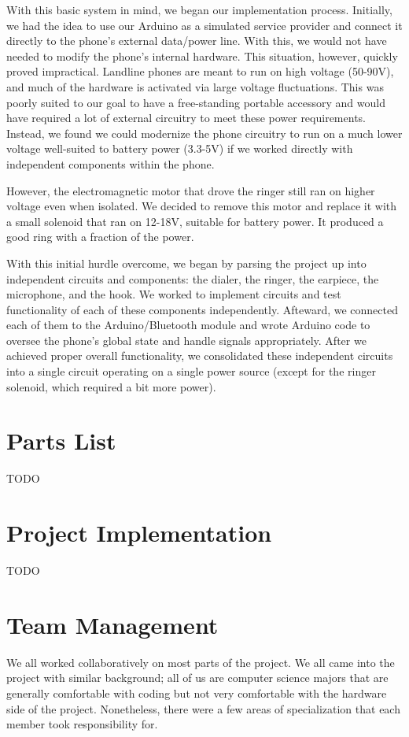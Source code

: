 \documentclass{es50report}
\begin{document}
        With this basic system in mind, we began our implementation process. Initially, we had the idea to use our Arduino as a simulated service provider and connect it directly to the phone's external data/power line. With this, we would not have needed to modify the phone's internal hardware. This situation, however, quickly proved impractical. Landline phones are meant to run on high voltage (50-90V), and much of the hardware is activated via large voltage fluctuations. This was poorly suited to our goal to have a free-standing portable accessory and would have required a lot of external circuitry to meet these power requirements. Instead, we found we could modernize the phone circuitry to run on a much lower voltage well-suited to battery power (3.3-5V) if we worked directly with independent components within the phone.

        However, the electromagnetic motor that drove the ringer still ran on higher voltage even when isolated. We decided to remove this motor and replace it with a small solenoid that ran on 12-18V, suitable for battery power. It produced a good ring with a fraction of the power.

        With this initial hurdle overcome, we began by parsing the project up into independent circuits and components: the dialer, the ringer, the earpiece, the microphone, and the hook. We worked to implement circuits and test functionality of each of these components independently. Afteward, we connected each of them to the Arduino/Bluetooth module and wrote Arduino code to oversee the phone's global state and handle signals appropriately. After we achieved proper overall functionality, we consolidated these independent circuits into a single circuit operating on a single power source (except for the ringer solenoid, which required a bit more power).

    \section{Parts List}
    TODO

    \section{Project Implementation}
    TODO

    \section{Team Management}
        We all worked collaboratively on most parts of the project. We all came into the project with similar background; all of us are computer science majors that are generally comfortable with coding but not very comfortable with the hardware side of the project. Nonetheless, there were a few areas of specialization that each member took responsibility for.
\end{document}
